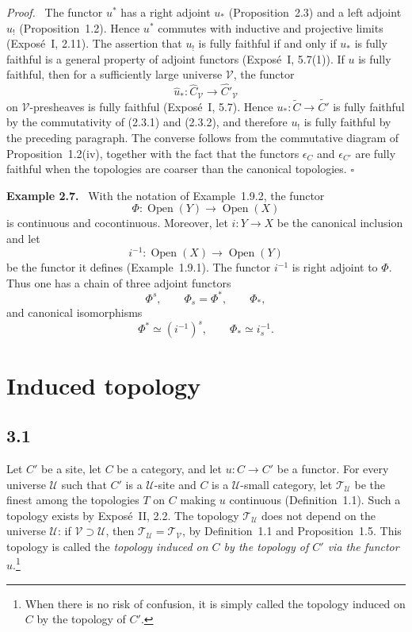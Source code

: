 \documentclass[11pt]{article}
\newcommand{\U}{\mathcal{U}}
\newcommand{\V}{\mathcal{V}}
\newcommand{\Ouv}{\operatorname{Open}}
\newcommand{\qedtext}{\hfill\(\square\)}
\newenvironment{remarktext}[1]{\par\medskip\noindent\textbf{#1.}\ }{\par\medskip}
\newenvironment{prooftext}{\par\noindent\emph{Proof.}\ }{\par\medskip}
\begin{document}
\begin{prooftext}
The functor \(u^*\) has a right adjoint \(u_*\) (Proposition~2.3) and a left adjoint \(u_!\) (Proposition~1.2). Hence \(u^*\) commutes with inductive and projective limits (Expos\'e~I, 2.11). The assertion that \(u_!\) is fully faithful if and only if \(u_*\) is fully faithful is a general property of adjoint functors (Expos\'e~I, 5.7(1)). If \(u\) is fully faithful, then for a sufficiently large universe \(\V\), the functor
\[
\widehat u_*:\widehat C_{\V}\longrightarrow\widehat{C'}_{\V}
\]
on \(\V\)-presheaves is fully faithful (Expos\'e~I, 5.7). Hence \(u_*:\widetilde C\to\widetilde{C'}\) is fully faithful by the commutativity of (2.3.1) and (2.3.2), and therefore \(u_!\) is fully faithful by the preceding paragraph. The converse follows from the commutative diagram of Proposition~1.2(iv), together with the fact that the functors \(\epsilon_C\) and \(\epsilon_{C'}\) are fully faithful when the topologies are coarser than the canonical topologies. \qedtext
\end{prooftext}

\begin{remarktext}{Example 2.7}
With the notation of Example~1.9.2, the functor
\[
\Phi:\Ouv(Y)\longrightarrow\Ouv(X)
\]
is continuous and cocontinuous. Moreover, let \(i:Y\to X\) be the canonical inclusion and let
\[
i^{-1}:\Ouv(X)\longrightarrow\Ouv(Y)
\]
be the functor it defines (Example~1.9.1). The functor \(i^{-1}\) is right adjoint to \(\Phi\). Thus one has a chain of three adjoint functors
\[
\Phi^s,
\qquad
\Phi_s=\Phi^*,
\qquad
\Phi_*,
\]
and canonical isomorphisms
\[
\Phi^*\simeq(i^{-1})^s,
\qquad
\Phi_*\simeq i^{-1}_s.
\]
\end{remarktext}

\section{Induced topology}

\subsection*{3.1}
Let \(C'\) be a site, let \(C\) be a category, and let \(u:C\to C'\) be a functor. For every universe \(\U\) such that \(C'\) is a \(\U\)-site and \(C\) is a \(\U\)-small category, let \(\mathcal T_{\U}\) be the finest among the topologies \(T\) on \(C\) making \(u\) continuous (Definition~1.1). Such a topology exists by Expos\'e~II, 2.2. The topology \(\mathcal T_{\U}\) does not depend on the universe \(\U\): if \(\V\supset\U\), then \(\mathcal T_{\U}=\mathcal T_{\V}\), by Definition~1.1 and Proposition~1.5. This topology is called the \emph{topology induced on \(C\) by the topology of \(C'\) via the functor \(u\)}.\footnote{When there is no risk of confusion, it is simply called the topology induced on \(C\) by the topology of \(C'\).}
\end{document}
